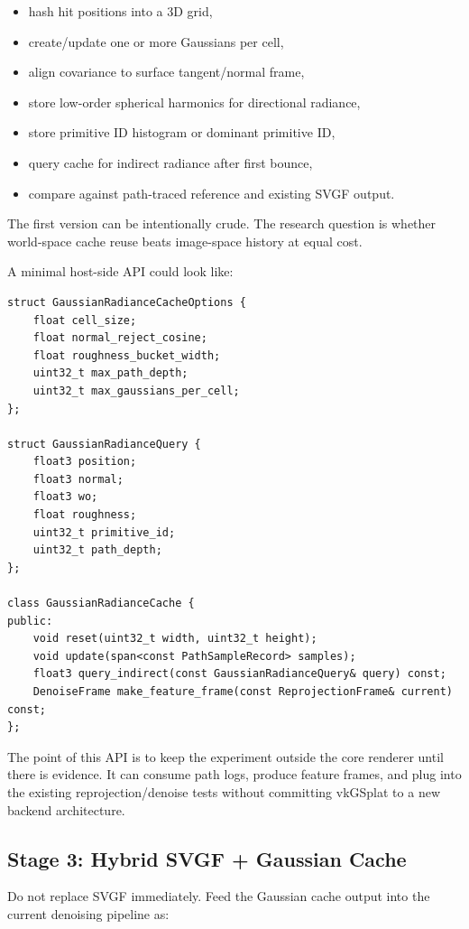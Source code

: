 \documentclass[11pt]{article}
\begin{document}
\begin{itemize}
  \item hash hit positions into a 3D grid,
  \item create/update one or more Gaussians per cell,
  \item align covariance to surface tangent/normal frame,
  \item store low-order spherical harmonics for directional radiance,
  \item store primitive ID histogram or dominant primitive ID,
  \item query cache for indirect radiance after first bounce,
  \item compare against path-traced reference and existing SVGF output.
\end{itemize}

The first version can be intentionally crude. The research question is whether
world-space cache reuse beats image-space history at equal cost.

A minimal host-side API could look like:

\begin{verbatim}
struct GaussianRadianceCacheOptions {
    float cell_size;
    float normal_reject_cosine;
    float roughness_bucket_width;
    uint32_t max_path_depth;
    uint32_t max_gaussians_per_cell;
};

struct GaussianRadianceQuery {
    float3 position;
    float3 normal;
    float3 wo;
    float roughness;
    uint32_t primitive_id;
    uint32_t path_depth;
};

class GaussianRadianceCache {
public:
    void reset(uint32_t width, uint32_t height);
    void update(span<const PathSampleRecord> samples);
    float3 query_indirect(const GaussianRadianceQuery& query) const;
    DenoiseFrame make_feature_frame(const ReprojectionFrame& current) const;
};
\end{verbatim}

The point of this API is to keep the experiment outside the core renderer until
there is evidence. It can consume path logs, produce feature frames, and plug
into the existing reprojection/denoise tests without committing vkGSplat to a
new backend architecture.

\subsection{Stage 3: Hybrid SVGF + Gaussian Cache}

Do not replace SVGF immediately. Feed the Gaussian cache output into the current
denoising pipeline as:
\end{document}
